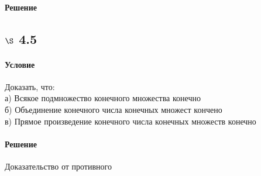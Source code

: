 \documentclass[a4paper,12pt]{article}
\begin{document}
\paragraph*{Решение}

\subsection*{$\S$ 4.5}
\paragraph*{Условие}
Доказать, что:\\
а) Всякое подмножество конечного множества конечно\\
б) Объединение конечного числа конечных множест кончено\\
в) Прямое произведение конечного числа конечных множеств конечно\\
\paragraph*{Решение}
Доказательство от противного 
\end{document}
